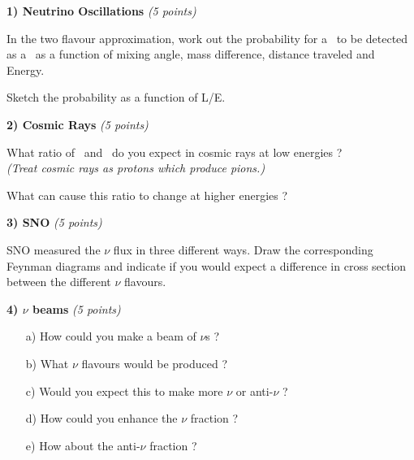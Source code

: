{\large

\textbf{1) Neutrino Oscillations } \hfill \textit{(5 points)}

In the two flavour approximation, work out the probability for a \nue\ to be detected as a \numu\ as a function of mixing angle, mass difference, distance traveled and Energy. 

Sketch the probability as a function of L/E. 

\vspace*{0.25in}



\textbf{2) Cosmic Rays } \hfill \textit{(5 points)}

What ratio of \nue\ and \numu\ do you expect in cosmic rays at low energies ?\\
\textit{(Treat cosmic rays as protons which produce pions.) }

What can cause this ratio to change at higher energies ?

\vspace*{0.25in}

\textbf{3) SNO } \hfill \textit{(5 points)}

SNO measured the $\nu$ flux in three different ways.
Draw the corresponding Feynman diagrams and indicate if you would expect a difference in cross section between the different $\nu$ flavours. 

\vspace*{0.25in}

\textbf{4) $\nu$ beams } \hfill \textit{(5 points)}

\begin{itemize}
\item[a)]How could you make a beam of $\nu$s ? 
\item[b)]What $\nu$ flavours would be produced ? 
\item[c)]Would you expect this to make more $\nu$ or anti-$\nu$ ? 
\item[d)]How could you enhance the $\nu$ fraction ? 
\item[e)]How about the  anti-$\nu$ fraction ?
\end{itemize}

}

